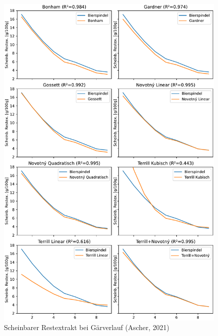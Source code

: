 \documentclass[a4paper,parskip=half]{scrartcl}
\begin{document}
\begin{figure}[H]
\centering
\includegraphics[width=14cm]{graph_fermentation.pdf}
\caption{Scheinbarer Restextrakt bei Gärverlauf (Ascher, 2021)}
\label{fig:novotnygraph}
\end{figure}
\end{document}
